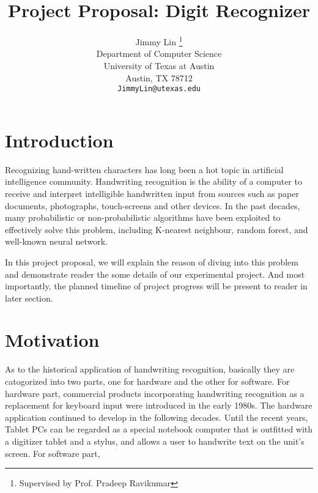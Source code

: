 \documentclass{article} %
\title{Project Proposal: Digit Recognizer}
\author{
Jimmy Lin \thanks{Supervised by Prof. Pradeep Ravikumar} \\
Department of Computer Science\\
University of Texas at Austin\\
Austin, TX 78712 \\
\texttt{JimmyLin@utexas.edu} \\
}
\begin{document}
\maketitle

%    


\section{Introduction}
Recognizing hand-written characters has long been a hot topic in artificial
intelligence community. 
Handwriting recognition is the ability of a computer to receive and
interpret intelligible handwritten input from sources such as paper documents,
photographs, touch-screens and other devices.
In the past decades, many probabilistic or non-probabilistic algorithms have been exploited to
effectively solve this problem, including K-nearest neighbour,
random forest, and well-known neural network. 

In this project proposal, we will explain the reason of diving into this
problem and demonstrate reader the some details of our experimental project.
And most importantly, the planned timeline of project progress will be present
to reader in later section.

\section{Motivation}



As to the historical application of handwriting recognition, basically they
are catogorized into two parts, one for hardware and the other for software.
For hardware part, commercial products incorporating handwriting
recognition as a replacement for keyboard input were introduced in the early
1980s. The hardware application continued to develop in the following decades.
Until the recent years, Tablet PCs can be regarded as a special notebook
computer that is outfitted with a digitizer tablet and a stylus, and
allows a user to handwrite text on the unit's screen. For software part, 
\end{document}
